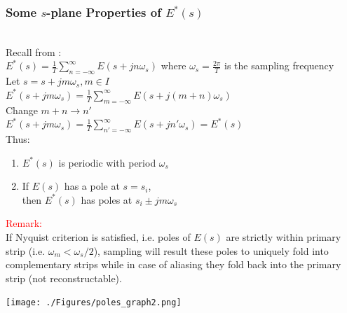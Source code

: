 \documentclass[mathserif, 10pt]{beamer} %
\def\3{\raisebox{.5pt}{\textcircled{\raisebox{-.9pt} {3}}}}
\begin{document}
\frame
{

\small

\frametitle{Some $s$-plane Properties of $E^*(s)$}
\vspace{-.8in}
\textcolor{red}{}\\
Recall from \3:\\
$E^*(s) =\frac{1}{T} \sum\limits_{n=-\infty}^\infty E(s+jn\omega_s)$ where $\omega_s = \frac{2\pi}{T}$ is the sampling frequency\\

Let $s=s+jm\omega_s, m\in I$\\
$E^*(s+jm\omega_s) = \frac{1}{T} \sum\limits_{m=-\infty}^{\infty} E(s+j(m+n)\omega_s)$\\
Change $m+n \to n'$\\
$E^*(s+jm\omega_s) = \frac{1}{T}\sum\limits_{n' = -\infty}^\infty E(s+jn'\omega_s) = E^*(s)$ \\ %
Thus:\\
\begin{enumerate}
\item  $E^*(s)$ is periodic with period $\omega_s$\\ \vspace{.1in}

\item If $E(s)$ has a pole at $s=s_i$,\\
 then $E^*(s)$ has poles at $s_i \pm jm\omega_s$\\

\end{enumerate}

\textcolor{red}{Remark:}\\
  If Nyquist criterion is satisfied, i.e. poles of $E(s)$ are strictly within primary strip (i.e. $\omega_m < \omega_s/2$), sampling will result these poles to uniquely fold into complementary strips while in case of aliasing they fold back into the primary strip (not reconstructable).

\vspace{-2.2in}
\hspace{2.7in}
\texttt{[image: ./Figures/poles\_graph2.png]}%
}
\end{document}

